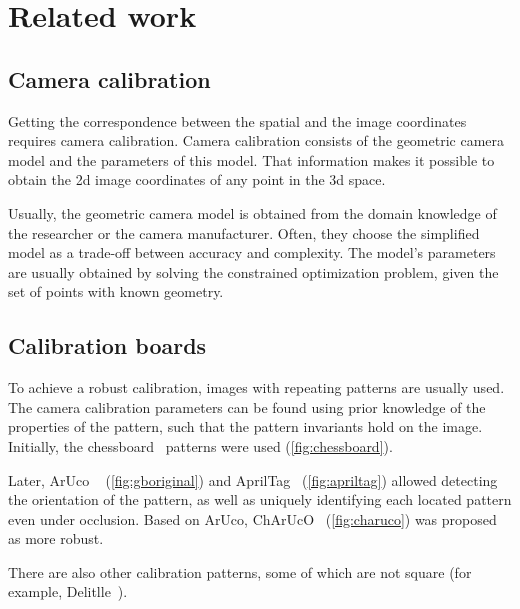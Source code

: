 \chapter{Related work}\label{cha:related_work}

\section{Camera calibration}\label{sub:camera_calibration}

Getting the correspondence between the spatial
and the image coordinates requires camera calibration. Camera
calibration consists of the geometric camera model and the parameters of this
model. That information makes it possible to obtain the 2d image coordinates
of any point in the 3d space.

Usually, the geometric camera model is obtained from the domain knowledge of the
researcher or the camera manufacturer. Often, they choose the simplified model as
a trade-off between accuracy and complexity. The model's parameters are usually
obtained by solving the constrained optimization problem, given the set of
points with known geometry.

\section{Calibration boards}\label{sub:calibration_boards}

To achieve a robust calibration, images with repeating patterns are
usually used. The camera
calibration parameters can be found using prior knowledge of the properties of
the pattern, such that the pattern invariants hold on
the image. Initially, the chessboard~\citep{OpenCVCameraCalibration,
	v.douskosAutomaticCalibrationDigital2007} patterns were used
(\cref{fig:chessboard}).

Later, ArUco
~\citep{garrido-juradoAutomaticGenerationDetection2014} (\cref{fig:gboriginal}) and
AprilTag~\citep{olsonAprilTagRobustFlexible2011a} (\cref{fig:apriltag})
allowed detecting the
orientation of the pattern, as well as uniquely identifying each located pattern
even under occlusion. Based on ArUco,
ChArUcO~\citep{OpenCVCameraCalibration} (\cref{fig:charuco}) was
proposed as more robust.

There are also other calibration patterns, some of which are not square (for
example, Delitlle~\citep{haDeltilleGridsGeometric2017}).

